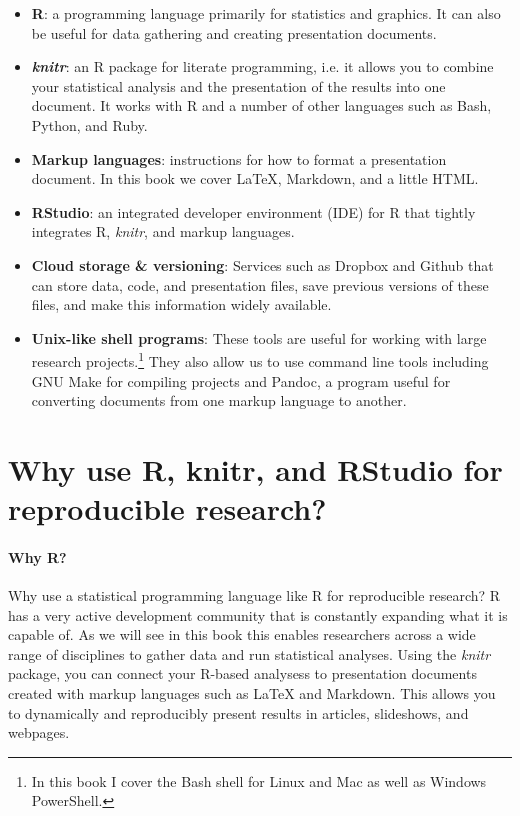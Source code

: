 \documentclass[krantz1]{krantz}
\begin{document}
\begin{itemize}
    \item {\bf{R}}: a programming language primarily for statistics and graphics. It can also be useful for data gathering and creating presentation documents.
    
    \item {\bf{{\emph{knitr}}}}: an R package for literate programming, i.e. it allows you to combine your statistical analysis and the presentation of the results into one document. It works with R and a number of other languages such as Bash, Python, and Ruby.
    
    \item {\bf{Markup languages}}: instructions for how to format a presentation document. In this book we cover LaTeX, Markdown, and a little HTML.  
    
    \item {\bf{RStudio}}: an integrated developer environment (IDE) for R that tightly integrates R, {\emph{knitr}}, and markup languages.
    
    \item {\bf{Cloud storage \& versioning}}: Services such as Dropbox and Github that can store data, code, and presentation files, save previous versions of these files, and make this information widely available.
    
    \item {\bf{Unix-like shell programs}}: These tools are useful for working with large research projects.\footnote{In this book I cover the Bash shell for Linux and Mac as well as Windows PowerShell.} They also allow us to use command line tools including GNU Make for compiling projects and Pandoc, a program useful for converting documents from one markup language to another.
\end{itemize}


\section{Why use R, knitr, and RStudio for reproducible research?}

\paragraph{Why R?}
Why use a statistical programming language like R for reproducible research? R has a very active development community that is constantly expanding what it is capable of. As we will see in this book this enables researchers across a wide range of disciplines to gather data and run statistical analyses. Using the {\emph{knitr}} package, you can connect your R-based analysess to presentation documents created with markup languages such as LaTeX and Markdown. This allows you to dynamically and reproducibly present results in articles, slideshows, and webpages. 
\end{document}
